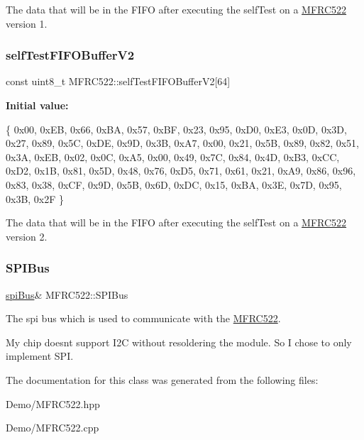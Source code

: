 The data that will be in the F\+I\+FO after executing the self\+Test on a \mbox{\hyperlink{class_m_f_r_c522}{M\+F\+R\+C522}} version 1. 

\mbox{\label{class_m_f_r_c522_a6973b73a8a922ac09b9d89489bdbc333}} 
\subsubsection{\texorpdfstring{self\+Test\+F\+I\+F\+O\+Buffer\+V2}{selfTestFIFOBufferV2}}
{\footnotesize\ttfamily const uint8\+\_\+t M\+F\+R\+C522\+::self\+Test\+F\+I\+F\+O\+Buffer\+V2\mbox{[}64\mbox{]}}

{\bfseries Initial value\+:}
\begin{DoxyCode}
\{
        0x00, 0xEB, 0x66, 0xBA, 0x57, 0xBF, 0x23, 0x95,
        0xD0, 0xE3, 0x0D, 0x3D, 0x27, 0x89, 0x5C, 0xDE,
        0x9D, 0x3B, 0xA7, 0x00, 0x21, 0x5B, 0x89, 0x82,
        0x51, 0x3A, 0xEB, 0x02, 0x0C, 0xA5, 0x00, 0x49,
        0x7C, 0x84, 0x4D, 0xB3, 0xCC, 0xD2, 0x1B, 0x81,
        0x5D, 0x48, 0x76, 0xD5, 0x71, 0x61, 0x21, 0xA9,
        0x86, 0x96, 0x83, 0x38, 0xCF, 0x9D, 0x5B, 0x6D,
        0xDC, 0x15, 0xBA, 0x3E, 0x7D, 0x95, 0x3B, 0x2F
    \}
\end{DoxyCode}


The data that will be in the F\+I\+FO after executing the self\+Test on a \mbox{\hyperlink{class_m_f_r_c522}{M\+F\+R\+C522}} version 2. 

\mbox{\label{class_m_f_r_c522_a76b0186fcad01aafd3d7d7ae4da6a68c}} 
\subsubsection{\texorpdfstring{S\+P\+I\+Bus}{SPIBus}}
{\footnotesize\ttfamily \mbox{\hyperlink{classspi_bus}{spi\+Bus}}\& M\+F\+R\+C522\+::\+S\+P\+I\+Bus\hspace{0.3cm}{\ttfamily [private]}}



The spi bus which is used to communicate with the \mbox{\hyperlink{class_m_f_r_c522}{M\+F\+R\+C522}}. 

My chip doesn\textquotesingle{}t support I2C without resoldering the module. So I chose to only implement S\+PI. 

The documentation for this class was generated from the following files\+:\begin{DoxyCompactItemize}
\item 
Demo/M\+F\+R\+C522.\+hpp\item 
Demo/M\+F\+R\+C522.\+cpp\end{DoxyCompactItemize}
